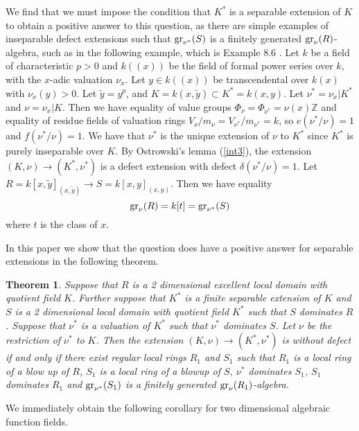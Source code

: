 \documentclass[11pt]{amsart}
\def\NZQ{\mathbb}               %
\def\ZZ{{\NZQ Z}}
\newtheorem{Theorem}{Theorem}[section]
\begin{document}
We  find that we must impose the condition that $K^*$ is a separable extension of $K$ to obtain a positive answer to this question, as there are simple examples of inseparable defect extensions such that  ${\rm gr}_{\nu^*}(S)$  is  a finitely  generated ${\rm gr}_{\nu}(R)$-algebra, such as in the following example, which is Example 8.6 \cite{Ku1}.  Let $k$ be a field of characteristic $p>0$ and $k((x))$ be the field of formal power series over $k$, with the $x$-adic valuation $\nu_x$. Let $y\in k((x))$ be transcendental over $k(x)$ with $\nu_x(y)>0$. Let $\tilde y=y^{p}$, and $K=k(x,\tilde y)\subset  K^*=k(x,y)$. Let $\nu^*=\nu_x|K^*$ and $\nu=\nu_x|K$. Then we have equality of value groups
$\Phi_{\nu}=\Phi_{\nu^*}=\nu(x)\ZZ$ and equality of residue fields of valuation rings $V_{\nu}/m_{\nu}=V_{\nu^*}/m_{\nu^*}=k$, so $e(\nu^*/\nu)=1$ and $f(\nu^*/\nu)=1$. We have that $\nu^*$ is the unique extension of $\nu$ to $K^*$ since $K^*$ is purely inseparable over $K$. By Ostrowski's lemma (\ref{int3}),  
the extension $(K,\nu)\rightarrow (K^*,\nu^*)$ is a defect extension with defect $\delta(\nu^*/\nu)=1$. Let $R=k[x,\tilde y]_{(x,\tilde y)}\rightarrow S=k[x,y]_{(x,y)}$. Then we have equality
$$
{\rm gr}_{\nu}(R)=k[t]={\rm gr}_{\nu^*}(S)
$$
where $t$ is the class of $x$. 





In this paper we show that the question does have a positive answer for separable extensions in the following theorem.

\begin{Theorem}\label{Theorem4} 
Suppose that $R$ is a 2 dimensional excellent local domain with quotient field $K$. Further suppose that $K^*$ is a finite separable extension of $K$ and $S$ is a 2 dimensional local domain with quotient field
$K^*$ such that  $S$ dominates $R$. 
Suppose that $\nu^*$ is a valuation of $K^*$ such that 
 $\nu^*$ dominates $S$. Let $\nu$ be the restriction of $\nu^*$ to $K$.  Then the extension $(K,\nu)\rightarrow (K^*,\nu^*)$ is without defect if and only if there exist regular local rings $R_1$ and $S_1$ such that
 $R_1$ is a local ring of a blow up of $R$, $S_1$ is a local ring of a blowup of $S$, $\nu^*$ dominates $S_1$, $S_1$ dominates $R_1$ and ${\rm gr}_{\nu^*}(S_1)$ is a finitely generated ${\rm gr}_{\nu}(R_1)$-algebra.


\end{Theorem}

We immediately obtain  the following corollary for two dimensional algebraic function fields.
\end{document}
